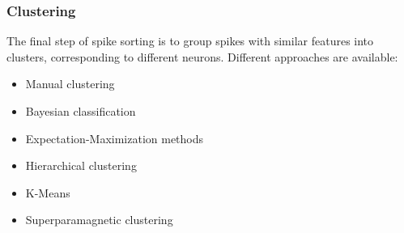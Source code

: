 \subsubsection{Clustering}
The final step of spike sorting is to group spikes with similar features into 
clusters, corresponding to different neurons. Different approaches are available:
\begin{itemize}
    \item Manual clustering
    \item Bayesian classification
    \item Expectation-Maximization methods
    \item Hierarchical clustering
    \item K-Means
    \item Superparamagnetic clustering
\end{itemize}
